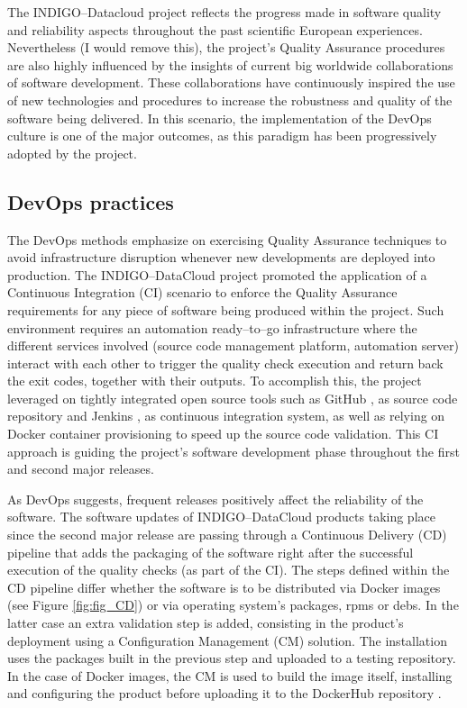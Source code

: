 \documentclass[journal]{IEEEtran}
\begin{document}
The INDIGO--Datacloud project reflects the progress made in software
quality and reliability aspects throughout the past scientific European
experiences. Nevertheless (I would remove this), the project’s Quality Assurance procedures are also
highly influenced by the insights of current big worldwide collaborations of
software development. These collaborations have continuously inspired the use of new
technologies and procedures to increase the robustness and quality of the
software being delivered. In this scenario, the implementation of the DevOps culture 
is one of the major outcomes, as this paradigm has been progressively adopted by the
project.

\subsection{DevOps practices}
\label{sec:devops}

The DevOps methods emphasize on exercising Quality Assurance techniques to
avoid infrastructure disruption whenever new developments are deployed into
production. The INDIGO--DataCloud project promoted the application of a 
Continuous Integration (CI) scenario to enforce the Quality Assurance requirements 
for any piece of software being produced within the project. Such environment 
requires an automation ready--to--go infrastructure where the different services involved
(source code management platform, automation server) interact with each other
to trigger the quality check execution and return back the exit codes, together
with their outputs. To accomplish this, the project leveraged on tightly
integrated open source tools such as GitHub \cite{github}, as source code repository
and Jenkins \cite{jenkins}, as continuous integration system, as well as relying on
Docker container provisioning to speed up the source code validation. This CI
approach is guiding the project’s software development phase throughout the
first and second major releases.

As DevOps suggests, frequent releases positively affect the reliability of the
software. The software updates of INDIGO--DataCloud products taking place since
the second major release are passing through a Continuous Delivery (CD)
pipeline that adds the packaging of the software right after the successful execution of
the quality checks (as part of the CI). 
The steps defined within the CD pipeline differ whether the software is to be distributed via Docker
images (see Figure \ref{fig:fig_CD}) or via operating system’s packages, rpms or debs. In the latter case an extra
validation step is added, consisting in the product’s deployment using a
Configuration Management (CM) solution. The installation uses the packages
built in the previous step and uploaded to a testing
repository. In the case of Docker images, the CM is used to build the image
itself, installing and configuring the product before uploading it to the
DockerHub repository \cite{indigo-dockerhub}. 
\end{document}
